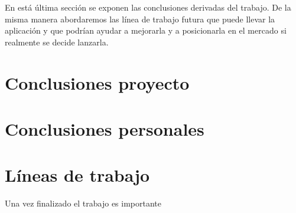 
En está última sección se exponen las conclusiones derivadas del trabajo. De la misma manera abordaremos las línea de trabajo futura que puede llevar la aplicación y que podrían ayudar a mejorarla y a posicionarla en el mercado si realmente se decide lanzarla.


  \section{Conclusiones proyecto}\label{conclusiones}
  
  \section{Conclusiones personales}\label{conclusiones}
  
   \section{Líneas de trabajo}\label{conclusiones}
   Una vez finalizado el trabajo es importante 
